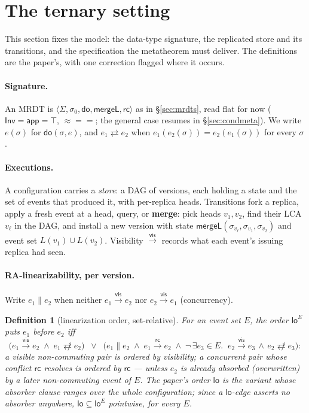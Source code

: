 \documentclass[11pt]{article}
\newtheorem{definition}[theorem]{Definition}
\newcommand{\vis}{\xrightarrow{\mathsf{vis}}}
\newcommand{\rc}{\xrightarrow{\mathsf{rc}}}
\newcommand{\comm}{\rightleftarrows}
\newcommand{\ncomm}{\not\rightleftarrows}
\newcommand{\mergeL}{\mathsf{mergeL}}
\newcommand{\Sinit}{\sigma_0}
\newcommand{\loE}[1]{\mathsf{lo}^{#1}}
\newcommand{\eqobs}{\approx}
\newcommand{\Inv}{\mathsf{Inv}}
\newcommand{\app}{\mathsf{app}}
\begin{document}
\section{The ternary setting}
\label{sec:setting}

This section fixes the model: the data-type signature, the replicated
store and its transitions, and the specification the metatheorem must
deliver. The definitions are the paper's, with one correction flagged
where it occurs.

\paragraph{Signature.} An MRDT is $\langle \Sigma, \Sinit, \mathsf{do},
\mergeL, \mathsf{rc}\rangle$ as in \S\ref{sec:mrdts}, read flat for now
($\Inv = \app = \top$, ${\eqobs} = {=}$; the general case resumes in
\S\ref{sec:condmeta}). We write $e(\sigma)$ for
$\mathsf{do}(\sigma,e)$, and $e_1 \comm e_2$ when
$e_1(e_2(\sigma)) = e_2(e_1(\sigma))$ for every $\sigma$.

\paragraph{Executions.} A configuration carries a \emph{store}: a DAG of
versions, each holding a state and the set of events that produced it,
with per-replica heads. Transitions fork a replica, apply a fresh event at
a head, query, or \textbf{merge}: pick heads $v_1, v_2$, find their LCA
$v_\ell$ in the DAG, and install a new version with state
$\mergeL(\sigma_{v_\ell}, \sigma_{v_1}, \sigma_{v_2})$ and event set
$L(v_1) \cup L(v_2)$. Visibility $\vis$ records what each event's issuing
replica had seen.

\paragraph{RA-linearizability, per version.} Write $e_1 \parallel e_2$
when neither $e_1 \vis e_2$ nor $e_2 \vis e_1$ (concurrency).

\begin{definition}[linearization order, set-relative]
\label{def:lo}
For an event set $E$, the order $\loE{E}$ puts $e_1$ before $e_2$ iff
\[
\bigl(e_1 \vis e_2 \;\wedge\; e_1 \ncomm e_2\bigr)
\;\;\vee\;\;
\bigl(e_1 \parallel e_2 \;\wedge\; e_1 \rc e_2 \;\wedge\;
  \neg\,\exists e_3 \in E.\;\; e_2 \vis e_3 \,\wedge\, e_2 \ncomm e_3\bigr):
\]
a visible non-commuting pair is ordered by visibility; a concurrent pair
whose conflict $\mathsf{rc}$ resolves is ordered by $\mathsf{rc}$ ---
unless $e_2$ is already \emph{absorbed} (overwritten) by a later
non-commuting event of $E$. The paper's order $\mathsf{lo}$ is the
variant whose absorber clause ranges over the whole configuration; since
a $\mathsf{lo}$-edge asserts \emph{no absorber anywhere},
$\mathsf{lo} \subseteq \loE{E}$ pointwise, for every $E$.
\end{definition}
\end{document}
